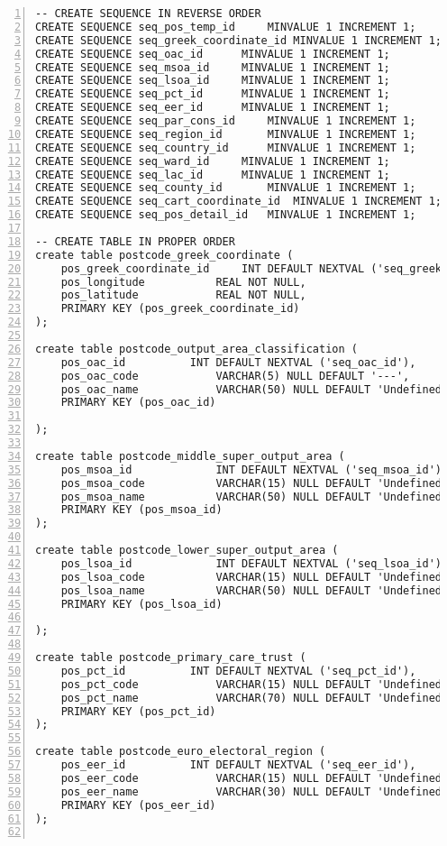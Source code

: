 \begin{lstlisting}[breaklines, frame=single, numbers=left, caption={PL/pgSQL's DDL scripts for Postcode Normalized Table Creation.}, label=commandline-02]
-- CREATE SEQUENCE IN REVERSE ORDER 
CREATE SEQUENCE seq_pos_temp_id		MINVALUE 1 INCREMENT 1;
CREATE SEQUENCE seq_greek_coordinate_id MINVALUE 1 INCREMENT 1; 
CREATE SEQUENCE seq_oac_id 		MINVALUE 1 INCREMENT 1; 
CREATE SEQUENCE seq_msoa_id		MINVALUE 1 INCREMENT 1; 
CREATE SEQUENCE seq_lsoa_id		MINVALUE 1 INCREMENT 1; 
CREATE SEQUENCE seq_pct_id 		MINVALUE 1 INCREMENT 1; 
CREATE SEQUENCE seq_eer_id 		MINVALUE 1 INCREMENT 1; 
CREATE SEQUENCE seq_par_cons_id		MINVALUE 1 INCREMENT 1; 
CREATE SEQUENCE seq_region_id		MINVALUE 1 INCREMENT 1; 
CREATE SEQUENCE seq_country_id		MINVALUE 1 INCREMENT 1; 
CREATE SEQUENCE seq_ward_id		MINVALUE 1 INCREMENT 1;
CREATE SEQUENCE seq_lac_id		MINVALUE 1 INCREMENT 1;
CREATE SEQUENCE seq_county_id		MINVALUE 1 INCREMENT 1;
CREATE SEQUENCE seq_cart_coordinate_id	MINVALUE 1 INCREMENT 1;
CREATE SEQUENCE seq_pos_detail_id	MINVALUE 1 INCREMENT 1;

-- CREATE TABLE IN PROPER ORDER 
create table postcode_greek_coordinate (
	pos_greek_coordinate_id 	INT DEFAULT NEXTVAL ('seq_greek_coordinate_id'),
	pos_longitude 			REAL NOT NULL,
	pos_latitude 			REAL NOT NULL,
	PRIMARY KEY (pos_greek_coordinate_id)
);

create table postcode_output_area_classification (
	pos_oac_id 			INT DEFAULT NEXTVAL ('seq_oac_id'), 
	pos_oac_code 			VARCHAR(5) NULL DEFAULT '---',
	pos_oac_name 			VARCHAR(50) NULL DEFAULT 'Undefined',
	PRIMARY KEY (pos_oac_id)

);

create table postcode_middle_super_output_area (
	pos_msoa_id 			INT DEFAULT NEXTVAL ('seq_msoa_id'),
	pos_msoa_code 			VARCHAR(15) NULL DEFAULT 'Undefined',
	pos_msoa_name 			VARCHAR(50) NULL DEFAULT 'Undefined',
	PRIMARY KEY (pos_msoa_id)
);

create table postcode_lower_super_output_area (
	pos_lsoa_id 			INT DEFAULT NEXTVAL ('seq_lsoa_id'),
	pos_lsoa_code 			VARCHAR(15) NULL DEFAULT 'Undefined',
	pos_lsoa_name 			VARCHAR(50) NULL DEFAULT 'Undefined',
	PRIMARY KEY (pos_lsoa_id)

);

create table postcode_primary_care_trust (
	pos_pct_id 			INT DEFAULT NEXTVAL ('seq_pct_id'),
	pos_pct_code 			VARCHAR(15) NULL DEFAULT 'Undefined',
	pos_pct_name 			VARCHAR(70) NULL DEFAULT 'Undefined',
	PRIMARY KEY (pos_pct_id)
);

create table postcode_euro_electoral_region (
	pos_eer_id 			INT DEFAULT NEXTVAL ('seq_eer_id'),
	pos_eer_code 			VARCHAR(15) NULL DEFAULT 'Undefined',
	pos_eer_name 			VARCHAR(30) NULL DEFAULT 'Undefined',
	PRIMARY KEY (pos_eer_id)
);


\end{lstlisting}
